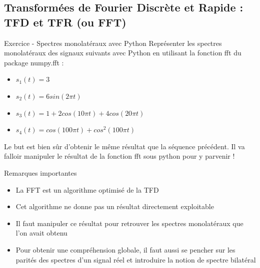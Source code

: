 \documentclass{beamer}
\newcounter{exampleBlockCounter}
\begin{document}
\subsection{Transformées de Fourier Discrète et Rapide : TFD et TFR (ou FFT)}
\begin{frame}
\begin{exampleblock}{Exercice  - Spectres monolatéraux avec Python}
Représenter les spectres monolatéraux des signaux suivants avec Python en utilisant la fonction fft du package numpy.fft :
\begin{itemize}
  \item $s_1(t) = 3$
  \item $s_2(t) = 6sin(2\pi t)$
  \item $s_3(t) = 1 + 2cos(10\pi t) + 4cos(20\pi t)$
  \item $s_4(t) = cos(100\pi t) + cos^2(100\pi t)$
\end{itemize}
Le but est bien sûr d'obtenir le même résultat que la séquence précédent. Il va falloir manipuler le résultat de la fonction fft sous python pour y parvenir ! 
\end{exampleblock}
\end{frame}

\begin{frame}
\begin{alertblock}{Remarques importantes}
\begin{itemize}
\item La FFT est un algorithme optimisé de la TFD
\item Cet algorithme ne donne pas un résultat directement exploitable
\item Il faut manipuler ce résultat pour retrouver les spectres monolatéraux que l'on avait obtenu
\item Pour obtenir une compréhension globale, il faut aussi se pencher sur les parités des spectres d'un signal réel et introduire la notion de spectre bilatéral
\end{itemize}
\justifying

\end{alertblock}
\end{frame}

\end{document}
